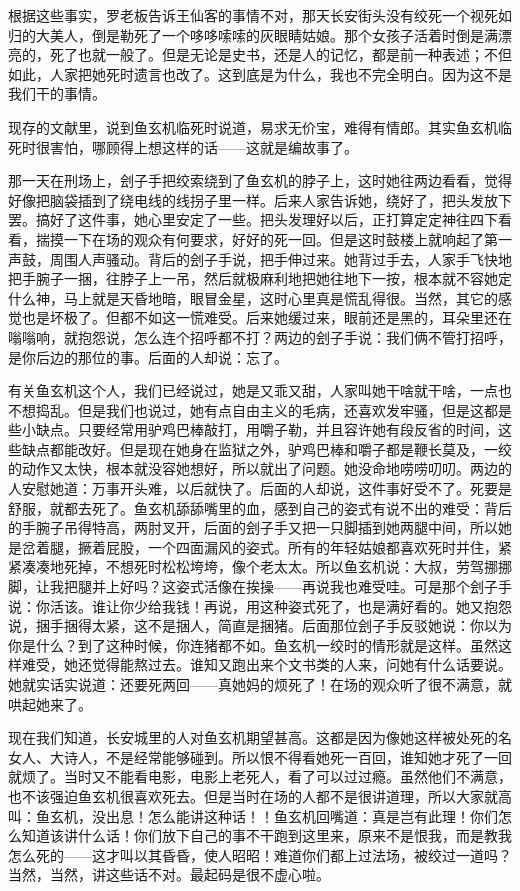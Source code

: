 根据这些事实，罗老板告诉王仙客的事情不对，那天长安街头没有绞死一个视死如归的大美人，倒是勒死了一个哆哆嗦嗦的灰眼睛姑娘。那个女孩子活着时倒是满漂亮的，死了也就一般了。但是无论是史书，还是人的记忆，都是前一种表述；不但如此，人家把她死时遗言也改了。这到底是为什么，我也不完全明白。因为这不是我们干的事情。 

现存的文献里，说到鱼玄机临死时说道，易求无价宝，难得有情郎。其实鱼玄机临死时很害怕，哪顾得上想这样的话——这就是编故事了。 

那一天在刑场上，刽子手把绞索绕到了鱼玄机的脖子上，这时她往两边看看，觉得好像把脑袋插到了绕电线的线拐子里一样。后来人家告诉她，绕好了，把头发放下罢。搞好了这件事，她心里安定了一些。把头发理好以后，正打算定定神往四下看看，揣摸一下在场的观众有何要求，好好的死一回。但是这时鼓楼上就响起了第一声鼓，周围人声骚动。背后的刽子手说，把手伸过来。她背过手去，人家手飞快地把手腕子一捆，往脖子上一吊，然后就极麻利地把她往地下一按，根本就不容她定什么神，马上就是天昏地暗，眼冒金星，这时心里真是慌乱得很。当然，其它的感觉也是坏极了。但都不如这一慌难受。后来她缓过来，眼前还是黑的，耳朵里还在嗡嗡响，就抱怨说，怎么连个招呼都不打？两边的刽子手说：我们俩不管打招呼，是你后边的那位的事。后面的人却说：忘了。 

有关鱼玄机这个人，我们已经说过，她是又乖又甜，人家叫她干啥就干啥，一点也不想捣乱。但是我们也说过，她有点自由主义的毛病，还喜欢发牢骚，但是这都是些小缺点。只要经常用驴鸡巴棒敲打，用嚼子勒，并且容许她有段反省的时间，这些缺点都能改好。但是现在她身在监狱之外，驴鸡巴棒和嚼子都是鞭长莫及，一绞的动作又太快，根本就没容她想好，所以就出了问题。她没命地唠唠叨叨。两边的人安慰她道：万事开头难，以后就快了。后面的人却说，这件事好受不了。死要是舒服，就都去死了。鱼玄机舔舔嘴里的血，感到自己的姿式有说不出的难受：背后的手腕子吊得特高，两肘叉开，后面的刽子手又把一只脚插到她两腿中间，所以她是岔着腿，撅着屁股，一个四面漏风的姿式。所有的年轻姑娘都喜欢死时并住，紧紧凑凑地死掉，不想死时松松垮垮，像个老太太。所以鱼玄机说：大叔，劳驾挪挪脚，让我把腿并上好吗？这姿式活像在挨操——再说我也难受哇。可是那个刽子手说：你活该。谁让你少给我钱！再说，用这种姿式死了，也是满好看的。她又抱怨说，捆手捆得太紧，这不是捆人，简直是捆猪。后面那位刽子手反驳她说：你以为你是什么？到了这种时候，你连猪都不如。鱼玄机一绞时的情形就是这样。虽然这样难受，她还觉得能熬过去。谁知又跑出来个文书类的人来，问她有什么话要说。她就实话实说道：还要死两回——真她妈的烦死了！在场的观众听了很不满意，就哄起她来了。 

现在我们知道，长安城里的人对鱼玄机期望甚高。这都是因为像她这样被处死的名女人、大诗人，不是经常能够碰到。所以恨不得看她死一百回，谁知她才死了一回就烦了。当时又不能看电影，电影上老死人，看了可以过过瘾。虽然他们不满意，也不该强迫鱼玄机很喜欢死去。但是当时在场的人都不是很讲道理，所以大家就高叫：鱼玄机，没出息！怎么能讲这种话！！鱼玄机回嘴道：真是岂有此理！你们怎么知道该讲什么话！你们放下自己的事不干跑到这里来，原来不是恨我，而是教我怎么死的——这才叫以其昏昏，使人昭昭！难道你们都上过法场，被绞过一道吗？当然，当然，讲这些话不对。最起码是很不虚心啦。 

